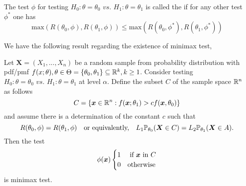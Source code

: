 \begin{definition}
    The test $\phi$ for testing 
    $H_0: \theta = \theta_0 \textit{ vs. } H_1: \theta = \theta_1$ 
    is called the  if for any other test $\phi^*$ one has 
    $$
    \text{max}(R(\theta_0,\phi),R(\theta_1,\phi)) \leq 
    \text{max}(R(\theta_0,\phi^*),R(\theta_1,\phi^*))
    $$
\end{definition}
We have the following result regarding the existence of minimax test,

\begin{theorem}
    Let $\boldsymbol{X} = (X_1,...,X_n)$ be a random sample from probability distribution with pdf/pmf $f(x;\theta), \theta \in \Theta = \{\theta_0,\theta_1 \} \subseteq \mathbb R^{k}, k \geq 1$.
    Consider testing $H_0: \theta = \theta_0 \textit{ vs. } H_1: \theta = \theta_1$ at level $\alpha$. 
    Define the subset $C$ of the sample space $\mathbb R^n$ as follows
    $$
    C = \left\{ 
    \boldsymbol{x} \in \mathbb R^n : f(\boldsymbol{x};\theta_1) > cf(\boldsymbol{x}, \theta_0)
    \right\}
    $$
    and assume there is a determination of the constant $c$ such that 
    $$
    R(\theta_0,\phi) = R(\theta_1,\phi) \quad \text{or equivalently,} \quad
    L_1\mathbb P_{\theta_0}(\boldsymbol{X} \in C) = L_2\mathbb P_{\theta_1}(\boldsymbol{X} \in A).
    $$
    Then the test 
    $$
    \phi(\boldsymbol{x})
    \begin{cases}
    1 & \text{ if } \boldsymbol{x} \text{ in } C \\
    0 & \text{otherwise}
    \end{cases}
    $$
    is minimax test.
\end{theorem}
